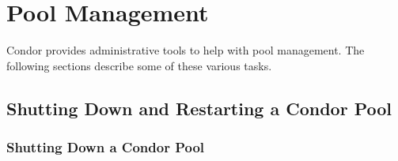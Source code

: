 \section{\label{sec:Pool-Management}Pool Management}

Condor provides administrative tools to help with
pool management.
The following sections describe some of these various tasks.

\Todo

\subsection{\label{sec:Pool-Shutdown-and-Restart}
Shutting Down and Restarting a Condor Pool}


\subsubsection{\label{sec:Pool-Shutdown}Shutting Down a Condor Pool}


